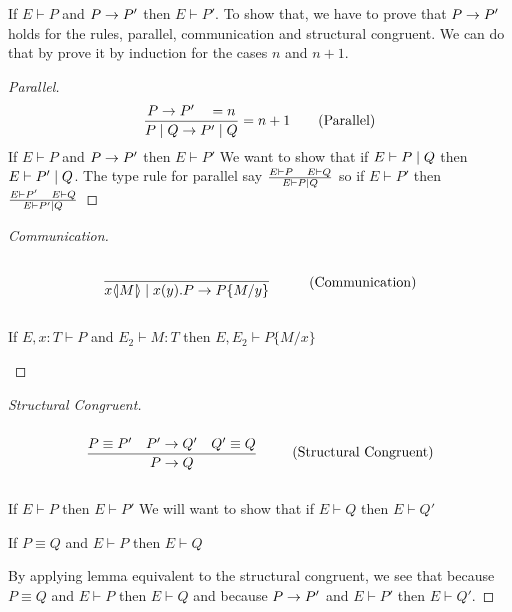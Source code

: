\begin{theorem}
If \ensuremath{E \vdash P} and \ensuremath{P\ra P'} then \ensuremath{E \vdash P'}.
To show that, we have to prove that \ensuremath{P \ra P'} holds for the rules, parallel, communication and structural congruent. We can do that by prove it by induction for the cases \ensuremath{n} and \ensuremath{n+1}.

\begin{proof}[Parallel]
\begin{align*}
    \frac{P \rightarrow P' \quad =n}{P \mid Q \rightarrow P' \mid Q} =n+1 \tag{Parallel}
\end{align*}
If \ensuremath{E \vdash P} and \ensuremath{P \ra P'} then \ensuremath{E \vdash P'} We want to show that if \ensuremath{E \vdash P \para Q} then \ensuremath{E \vdash P' \para Q}. The type rule for parallel say \ensuremath{\frac{E \vdash P\quad E \vdash Q}{E \vdash P \para Q}} so if \ensuremath{E \vdash P'} then \ensuremath{\frac{E \vdash P' \quad E \vdash Q}{E \vdash P' \para Q}}
\end{proof}

\begin{proof}[Communication]
\begin{align*}
    \infrule{}{\lift{x}{M}\para\inp{x}{y}P\ra P\{M/y\}} \tag{Communication}
\end{align*}

\begin{lemma}[Substitution]
If \ensuremath{E,x:T \vdash P} and \ensuremath{E_2 \vdash M:T} then \ensuremath{E, E_2 \vdash P\{M/x \}}
\end{lemma}

\end{proof}

\begin{proof}[Structural Congruent]
\begin{align*}
    \infrule{P \equiv P' \quad P' \ra Q' \quad Q' \equiv Q}{P \ra Q} \tag{Structural Congruent}
\end{align*}

If \ensuremath{E \vdash P} then \ensuremath{E \vdash P'} We will want to show that if \ensuremath{E \vdash Q} then \ensuremath{E \vdash Q'}

\begin{lemma}[Equivalent]
If \ensuremath{P \equiv Q} and \ensuremath{E \vdash P} then \ensuremath{E \vdash Q}
\end{lemma}

By applying lemma equivalent to the structural congruent, we see that because \ensuremath{P \equiv Q} and \ensuremath{E \vdash P} then \ensuremath{E \vdash Q} and because \ensuremath{P \ra P'} and \ensuremath{E \vdash P'} then \ensuremath{E \vdash Q'}.
\end{proof}

\end{theorem}


